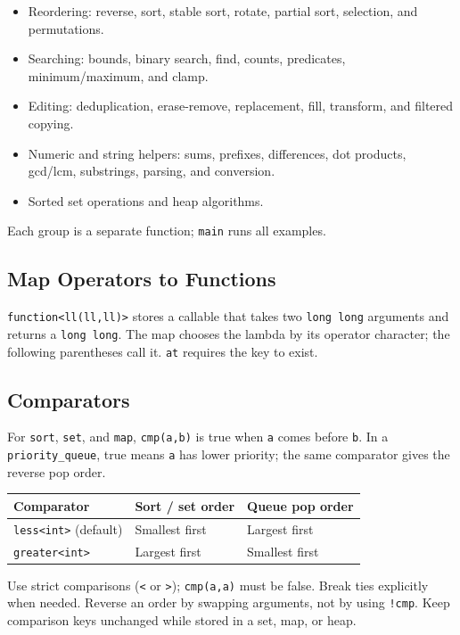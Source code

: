 \begin{itemize}
\item Reordering: reverse, sort, stable sort, rotate, partial sort,
selection, and permutations.
\item Searching: bounds, binary search, find, counts, predicates,
minimum/maximum, and clamp.
\item Editing: deduplication, erase-remove, replacement, fill,
transform, and filtered copying.
\item Numeric and string helpers: sums, prefixes, differences, dot
products, gcd/lcm, substrings, parsing, and conversion.
\item Sorted set operations and heap algorithms.
\end{itemize}
Each group is a separate function; \texttt{main} runs all examples.

\endgroup


\begingroup
\raggedright
\subsection{Map Operators to Functions}
\texttt{function<ll(ll,ll)>} stores a callable that takes two
\texttt{long long} arguments and returns a \texttt{long long}.
The map chooses the lambda by its operator character; the following
parentheses call it. \texttt{at} requires the key to exist.
\begin{minipage}{\linewidth}

\end{minipage}
\par

\subsection{Comparators}
For \texttt{sort}, \texttt{set}, and \texttt{map}, \texttt{cmp(a,b)}
is true when \texttt{a} comes before \texttt{b}. In a
\texttt{priority\_queue}, true means \texttt{a} has lower priority;
the same comparator gives the reverse pop order.
\begin{center}
\begin{tabular}{lll}
\textbf{Comparator} & \textbf{Sort / set order} & \textbf{Queue pop order} \\
\hline
\texttt{less<int>} (default) & Smallest first & Largest first \\
\texttt{greater<int>} & Largest first & Smallest first \\
\end{tabular}
\end{center}
Use strict comparisons (\texttt{<} or \texttt{>});
\texttt{cmp(a,a)} must be false. Break ties explicitly when needed.
Reverse an order by swapping arguments, not by using \texttt{!cmp}.
Keep comparison keys unchanged while stored in a set, map, or heap.

\endgroup
